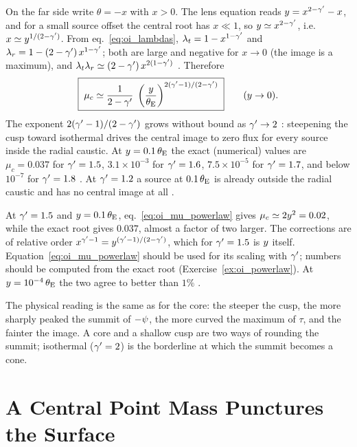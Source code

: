 On the far side write $\theta=-x$ with $x>0$.  The lens equation reads
$y = x^{2-\gamma'}-x$, and for a small source offset the central root
has $x\ll1$, so $y\simeq x^{2-\gamma'}$, i.e.\ $x\simeq y^{1/(2-\gamma')}$.
From eq.~\eqref{eq:oi_lambdas},
$\lambda_t = 1-x^{1-\gamma'}$ and $\lambda_r = 1-(2-\gamma')\,x^{1-\gamma'}$; both
are large and negative for $x\to0$ (the image is a maximum), and
$\lambda_t\lambda_r\simeq(2-\gamma')\,x^{2(1-\gamma')}$ .  Therefore
\begin{equation}
    \boxed{\;
    \mu_c \simeq \frac{1}{2-\gamma'}\;\left(\frac{y}{\theta_{\mathrm{E}}}\right)^{2(\gamma'-1)/(2-\gamma')}
    \;}
    \qquad (y\to0).
    \label{eq:oi_mu_powerlaw}
\end{equation}
The exponent $2(\gamma'-1)/(2-\gamma')$ grows without bound as $\gamma'\to2$
: steepening the cusp toward isothermal drives the central
image to zero flux for every source inside the radial caustic.  At
$y=0.1\,\theta_{\mathrm{E}}$ the exact (numerical) values are $\mu_c=0.037$
for $\gamma'=1.5$, $3.1\times10^{-3}$ for $\gamma'=1.6$, $7.5\times10^{-5}$ for
$\gamma'=1.7$, and below $10^{-7}$ for $\gamma'=1.8$ .  At
$\gamma'=1.2$ a source at $0.1\,\theta_{\mathrm{E}}$ is already outside the radial
caustic and has no central image at all .

\begin{annotation}
At $\gamma'=1.5$ and $y=0.1\,\theta_{\mathrm{E}}$, eq.~\eqref{eq:oi_mu_powerlaw}
gives $\mu_c\simeq2y^2=0.02$, while the exact root gives $0.037$,
almost a factor of two larger.  The corrections are of relative order
$x^{\gamma'-1}=y^{(\gamma'-1)/(2-\gamma')}$, which for $\gamma'=1.5$ is
$y$ itself.  Equation~\eqref{eq:oi_mu_powerlaw} should be used for
its scaling with $\gamma'$; numbers should be computed from the exact root
(Exercise~\ref{ex:oi_powerlaw}).  At $y=10^{-4}\,\theta_{\mathrm{E}}$ the two
agree to better than $1\%$ .
\end{annotation}

The physical reading is the same as for the core: the steeper the cusp,
the more sharply peaked the summit of $-\psi$, the more curved the
maximum of $\tau$, and the fainter the image.  A core and a shallow
cusp are two ways of rounding the summit; isothermal ($\gamma'=2$) is the
borderline at which the summit becomes a cone.


\section{A Central Point Mass Punctures the Surface}
\label{sec:oi_pointmass}

